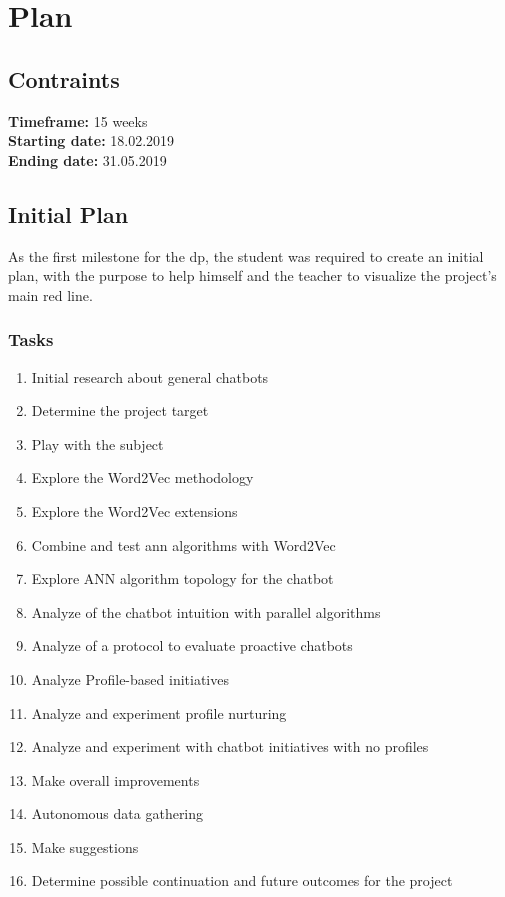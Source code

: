 \chapter{Plan}


\section{Contraints}
\textbf{Timeframe:} 15 weeks\\
\textbf{Starting date:} 18.02.2019\\
\textbf{Ending date:} 31.05.2019

\section{Initial Plan}
\label{plan:initial}
As the first milestone for the \gls{dp}, the student was required to create an initial plan, with the purpose to help himself and the teacher to visualize the project's main red line.
\subsection{Tasks}
\begin{enumerate}
    \setlength\itemsep{0em}
    \item Initial research about general chatbots
    \item Determine the project target
    \item Play with the subject
    \item Explore the Word2Vec methodology
    \item Explore the Word2Vec extensions
    \item Combine and test \acrshort{ann} algorithms with Word2Vec
    \item Explore ANN algorithm topology for the chatbot
    \item Analyze of the chatbot intuition with parallel algorithms
    \item Analyze of a protocol to evaluate proactive chatbots
    \item Analyze Profile-based initiatives
    \item Analyze and experiment profile nurturing 
    \item Analyze and experiment with chatbot initiatives with no profiles
    \item Make overall improvements
    \item Autonomous data gathering
    \item Make suggestions
    \item Determine possible continuation and future outcomes for the project
\end{enumerate}

